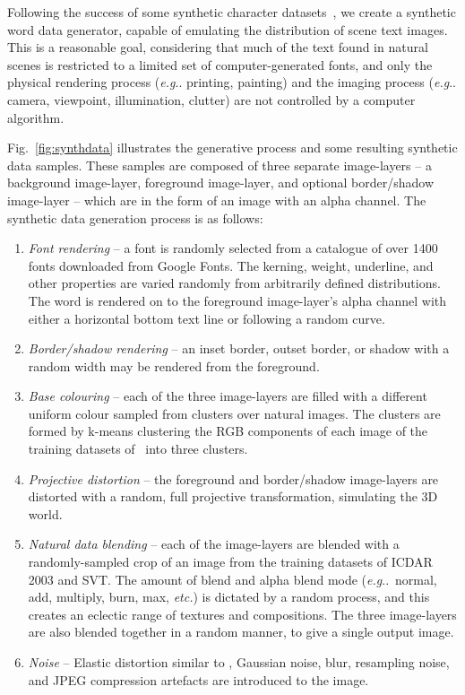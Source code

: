 \documentclass[twocolumn]{svjour3}          \smartqed  \usepackage{epsfig}
\makeatletter
\DeclareRobustCommand\onedot{\futurelet\@let@token\@onedot}
\def\@onedot{\ifx\@let@token.\else.\null\fi\xspace}
\def\eg{\emph{e.g}\onedot} \def\Eg{\emph{E.g}\onedot}
\makeatother
\begin{document}
Following the success of some synthetic character datasets~\cite{Campos09,Wang12}, we create a synthetic word data generator, capable of emulating the distribution of scene text images. This is a reasonable goal, considering that much of the text found in natural scenes is restricted to a limited set of computer-generated fonts, and only the physical rendering process (\eg printing, painting) and the imaging process (\eg camera, viewpoint, illumination, clutter) are not controlled by a computer algorithm. 

Fig.~\ref{fig:synthdata} illustrates the generative process and some resulting synthetic data samples. These samples are composed of three separate image-layers -- a background image-layer, foreground image-layer, and optional border/shadow image-layer -- which are in the form of an image with an alpha channel. The synthetic data generation process is as follows:
\begin{enumerate}
  \item {\emph{Font rendering} -- a font is randomly selected from a catalogue of over 1400 fonts downloaded from Google Fonts. The kerning, weight, underline, and other properties are varied randomly from arbitrarily defined distributions. The word is rendered on to the foreground image-layer's alpha channel with either a horizontal bottom text line or following a random curve.}
  \item \emph{Border/shadow rendering} -- an inset border, outset border, or shadow with a random width may be rendered from the foreground.

\item \emph{Base colouring} -- each of the three image-layers are 
filled with a different uniform colour sampled
from clusters over natural images. The clusters are formed by
k-means clustering the RGB components of each image of the
training datasets of~\cite{ICDAR03} into three clusters.

  \item \emph{Projective distortion} -- the foreground and border/shadow image-layers are distorted with a random, full projective transformation, simulating the 3D world.
  \item \emph{Natural data blending} -- each of the image-layers are blended with a randomly-sampled crop of an image from the training datasets of ICDAR 2003 and SVT. The amount of blend and alpha blend mode (\eg~normal, add, multiply, burn, max, \emph{etc.}) is dictated by a random process, and this creates an eclectic range of textures and compositions. The three image-layers are also blended together in a random manner, to give a single output image.
  \item \emph{Noise} -- Elastic distortion similar to \cite{Simard03}, Gaussian noise, blur, resampling noise, and JPEG compression artefacts are introduced to the image.
\end{enumerate}
\end{document}
